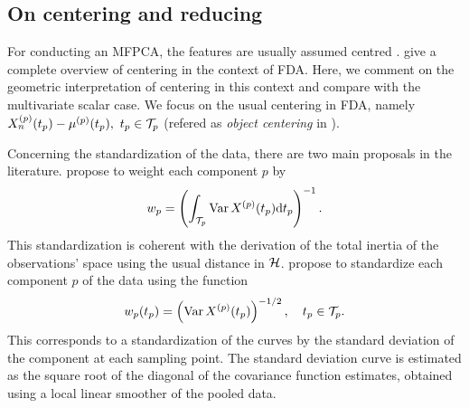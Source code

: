 \subsection{On centering and reducing} %
\label{sub:on_centering_and_reducing}

For conducting an MFPCA, the features are usually assumed centred \citep{happMultivariateFunctionalPrincipal2018a}. \cite{protheroNewPerspectivesCentering2023} give a complete overview of centering in the context of FDA. Here, we comment on the geometric interpretation of centering in this context and compare with the multivariate scalar case. We focus on the usual centering in FDA, namely $X_n^{(p)}(t_p) - \mu^{(p)}(t_p),~t_p \in \mathcal{T}_{p}$ (refered as \emph{object centering} in \cite{protheroNewPerspectivesCentering2023}).

Concerning the standardization of the data, there are two main proposals in the literature. \cite{happMultivariateFunctionalPrincipal2018a} propose to weight each component $p$ by
\begin{equation}
w_p = \left(\int_{\mathcal{T}_{p}} \operatorname{Var} X^{(p)}(t_p) {\rm d} t_p\right)^{-1}.
\end{equation}
This standardization is coherent with the derivation of the total inertia of the observations' space using the usual distance in $\mathcal{H}$. \cite{chiouMultivariateFunctionalPrincipal2014} propose to standardize each component $p$ of the data using the function
\begin{equation}
w_p(t_p) = \left(\operatorname{Var} X^{(p)}(t_p)\right)^{-1/2}, \quad t_p \in \mathcal{T}_{p}.
\end{equation}
This corresponds to a standardization of the curves by the standard deviation of the component at each sampling point. The standard deviation curve is estimated as the square root of the diagonal of the covariance function estimates, obtained using a local linear smoother of the pooled data. 


